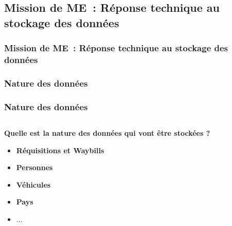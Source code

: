 \subsection{Mission de ME~: Réponse technique au stockage des données}
\begin{frame}
	\frametitle{Mission de ME~: Réponse technique au stockage des données}
\end{frame}



\subsubsection{Nature des données}
\begin{frame}
\frametitle{Nature des données}
\begin{columns}[c]
\begin{column}{12cm}
\begin{block}{\textbf{Quelle est la nature des données qui vont être stockées ?}}
\begin{itemize}
\item<2-> \textbf{Réquisitions et Waybills}
\item<3-> \textbf{Personnes}
\item<4-> \textbf{Véhicules}
\item<5-> \textbf{Pays}
\item<6-> ...
\end{itemize}
\end{block}
\end{column}
\end{columns}
\end{frame}

